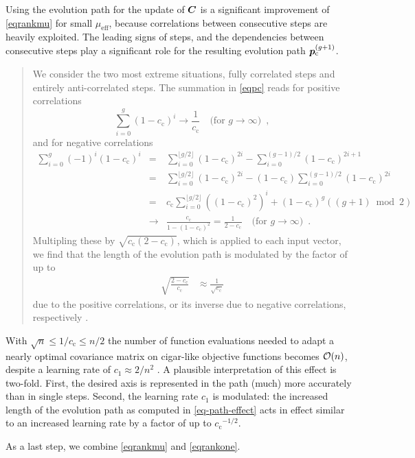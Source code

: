 \documentclass{article} %
\newenvironment{einschub}{%
\begin{small} \begin{quotation}\noindent}{%
  \vspace{0.5ex}\end{quotation}\end{small}%
}
\newcommand{\ve}[1]{\mathchoice{\mbox{\boldmath$\displaystyle#1$}}
  {\mbox{\boldmath$\textstyle#1$}} {\mbox{\boldmath$\scriptstyle#1$}}
  {\mbox{\boldmath$\scriptscriptstyle#1$}}}
\newcommand{\ma}[1]{\mathchoice{\mbox{\boldmath$\displaystyle#1$}}
  {\mbox{\boldmath$\textstyle#1$}} {\mbox{\boldmath$\scriptstyle#1$}}
  {\mbox{\boldmath$\scriptscriptstyle#1$}}}
\newcommand{\N}{\ensuremath{n}}
\newcommand{\rklam}[1]{\left({#1}\right)}
\newcommand{\gen}{\ensuremath{g}}
\newcommand{\mueff}{\ensuremath{\mu_\mathrm{eff}}}
\newcommand{\cc}{\ensuremath{c_\mathrm{c}}}
\newcommand{\pcgg}{\ve{p}_\mathrm{c}^{(g+1)}}
\newcommand{\cone}{\ensuremath{c_1}}
\begin{document}
Using the evolution path for the update of $\ma{C}$ is a significant
improvement of \eqref{eqrankmu} for small $\mueff$, because
correlations between consecutive steps are heavily exploited. The leading
signs of steps, and the dependencies between consecutive steps play a
significant role for the resulting evolution path $\pcgg$.
%
\begin{einschub}%
We consider the two most extreme situations, fully correlated steps and entirely anti-correlated steps. The summation in \eqref{eqpc} reads for positive correlations
$$
\sum_{i=0}^\gen (1-\cc)^i \to \frac{1}{\cc} \quad\text{(for $\gen\to\infty$)}\enspace,
$$
and for negative correlations
\begin{eqnarray*}
\sum_{i=0}^\gen (-1)^i (1-\cc)^i 
&=& \sum_{i=0}^{\lfloor\gen/2\rfloor} (1-\cc)^{2i} - \sum_{i=0}^{(\gen-1)/2} (1-\cc)^{2i+1} 
\\
&=& \sum_{i=0}^{\lfloor\gen/2\rfloor} (1-\cc)^{2i} - (1-\cc)\!\!\sum_{i=0}^{(\gen-1)/2} (1-\cc)^{2i}
\\ 
&=& \cc \sum_{i=0}^{\lfloor\gen/2\rfloor} \rklam{(1-\cc)^2}^i 
  + (1-\cc)^\gen ((g + 1) \bmod 2) 
\\
&\to& \frac{\cc}{1-(1-\cc)^2} = \frac{1}{2-\cc} \quad\text{(for $\gen\to\infty$)}\enspace.
\end{eqnarray*}%
\newcommand{\fracc}[2]{#1/#2}%
Multipling these by $\sqrt{\cc(2-\cc)}$, which is 
applied to each input vector, we find that the length of the evolution
path is modulated by the factor of up to 
\begin{align}\label{eq-path-effect}
\sqrt{\frac{2-\cc}{\cc}} &\approx \frac{1}{\sqrt{\cc}}
\end{align}
due to the positive correlations, or its inverse due to negative correlations, respectively \cite[Equations (48) and (49)]{hansen2014principled}.  
\end{einschub}%
%
With $\sqrt{\N}\le1/\cc\le\N/2$ the number of function evaluations needed to adapt a
nearly optimal covariance matrix on cigar-like objective functions
becomes ${\cal O}(\N)$, despite a learning rate of $\cone\approx2/\N^2$ \cite{hansen2014principled}. A plausible interpretation of this effect is two-fold. First, the desired axis is represented in the path (much) more accurately than in single steps. Second, the learning rate $\cone$ is modulated: the increased length of the evolution path 
as computed in \eqref{eq-path-effect} acts in effect similar to an increased learning rate by a factor of up to $\cc^{-1/2}$.

As a last step, we combine \eqref{eqrankmu} and \eqref{eqrankone}.
\end{document}
